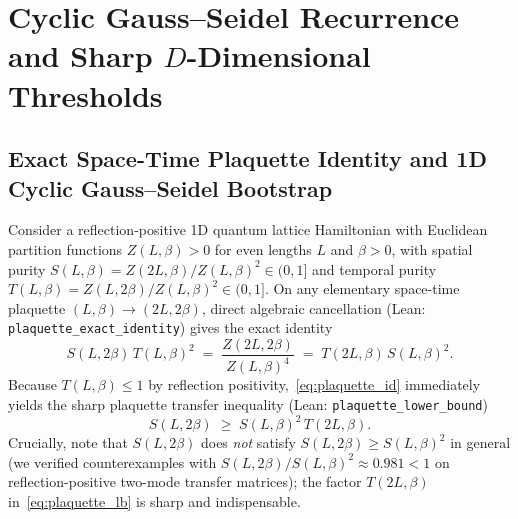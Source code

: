 \documentclass[11pt,a4paper]{article}
\theoremstyle{definition}
\begin{document}
\section{Cyclic Gauss--Seidel Recurrence and Sharp \texorpdfstring{$D$}{D}-Dimensional Thresholds}
\label{sec:thresholds}

\subsection{Exact Space-Time Plaquette Identity and 1D Cyclic Gauss--Seidel Bootstrap}

Consider a reflection-positive 1D quantum lattice Hamiltonian with Euclidean partition functions $Z(L,\beta) > 0$ for even lengths $L$ and $\beta > 0$, with spatial purity $S(L,\beta) = Z(2L,\beta)/Z(L,\beta)^2 \in (0,1]$ and temporal purity $T(L,\beta) = Z(L,2\beta)/Z(L,\beta)^2 \in (0,1]$. On any elementary space-time plaquette $(L,\beta) \to (2L,2\beta)$, direct algebraic cancellation (Lean: \texttt{plaquette\_exact\_identity}) gives the exact identity
\begin{equation}
  S(L, 2\beta)\, T(L,\beta)^2 \;=\; \frac{Z(2L, 2\beta)}{Z(L,\beta)^4} \;=\; T(2L, \beta)\, S(L,\beta)^2.
  \label{eq:plaquette_id}
\end{equation}
Because $T(L,\beta) \le 1$ by reflection positivity,~\eqref{eq:plaquette_id} immediately yields the sharp plaquette transfer inequality (Lean: \texttt{plaquette\_lower\_bound})
\begin{equation}
  S(L, 2\beta) \;\ge\; S(L,\beta)^2\, T(2L,\beta).
  \label{eq:plaquette_lb}
\end{equation}
Crucially, note that $S(L,2\beta)$ does \emph{not} satisfy $S(L,2\beta) \ge S(L,\beta)^2$ in general (we verified counterexamples with $S(L,2\beta)/S(L,\beta)^2 \approx 0.981 < 1$ on reflection-positive two-mode transfer matrices); the factor $T(2L,\beta)$ in~\eqref{eq:plaquette_lb} is sharp and indispensable.
\end{document}
